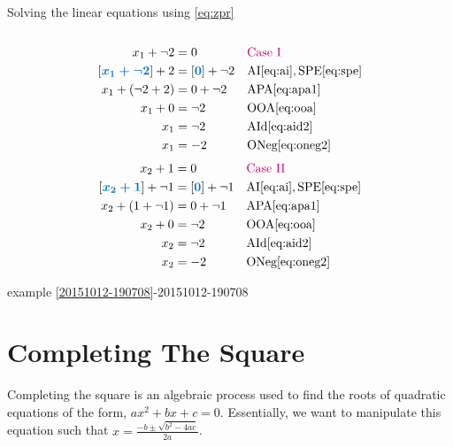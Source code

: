 \documentclass[20150903-160354-rs2.2-MarksMathNotebook.tex]{subfiles}
\begin{document}
\begin{example}[id:20151012-192313]
Solving the linear equations using  \eqref{eq:zpr} \\ \\
\begin{align*}
x_1+\neg 2& = 0  &&\text{\alert{Case I}} \\
\farg{x_1 +\neg 2}  + 2 &= \farg{0} + \neg 2 && \text{AI} \eqref{eq:ai},\text{SPE} \eqref{eq:spe}  \\
x_1+(\neg 2 + 2) &= 0 + \neg 2 && \text{APA} \eqref{eq:apa1} \\
x_1+0 &= \neg 2 && \text{OOA} \eqref{eq:ooa} \\
x_1&= \neg 2 && \text{AId} \eqref{eq:aid2} \\
x_1 &= -2 && \text{ONeg} \eqref{eq:oneg2} 
\end{align*}
\vspace{-0.5cm}
\begin{align*}
x_2+1 &= 0  &&\text{\alert{Case II}} \\
\farg{x_2+1} + \neg 1 &= \farg{0} + \neg 1 && \text{AI} \eqref{eq:ai},\text{SPE} \eqref{eq:spe}  \\
x_2 + (1 + \neg 1) &= 0+ \neg 1 && \text{APA} \eqref{eq:apa1} \\
x_2 + 0 &= \neg 2 && \text{OOA} \eqref{eq:ooa} \\
x_2 &= \neg 2 && \text{AId} \eqref{eq:aid2} \\
x_2 &= -2 && \text{ONeg} \eqref{eq:oneg2} 
\end{align*}

\qdepend

\qdependlist
example \ref{20151012-190708}-20151012-190708

\end{example}

\section{Completing The Square}

Completing the square is an algebraic process used to find the roots of quadratic equations of the form, $ax^2+bx+c=0$.   Essentially, we want to manipulate this equation such that $x=\frac{-  b  \pm \sqrt{b^2 - 4ac}}{2a}$.  
\end{document}
